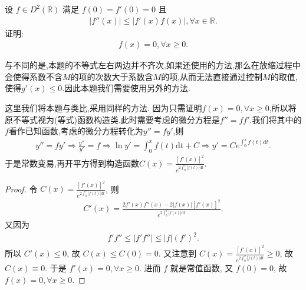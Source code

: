 \documentclass[../../main.tex]{subfiles}%
\begin{document}
\begin{example}
设 $f\in D^2(\mathbb{R})$ 满足 $f(0)=f'(0)=0$ 且
\begin{align*}
|f''(x)|\leqslant|f'(x)f(x)|,\forall x\in\mathbb{R}.
\end{align*}
证明:
\begin{align*}
f(x)=0,\forall x\geqslant 0.
\end{align*} 
\end{example}
\begin{remark}
与不同的是,本题的不等式左右两边并不齐次,如果还使用的方法,那么在放缩过程中会使得系数不含$M$的项的次数大于系数含$M$的项,从而无法直接通过控制$M$的取值,使得$g'(x)\leqslant 0$.因此本题我们需要使用另外的方法.

这里我们将本题与类比,采用同样的方法. 因为只需证明$f(x)=0,\forall x\geqslant 0$,所以将原不等式视为(等式)函数构造类.此时需要考虑的微分方程是$f''=ff'$.我们将其中的$f$看作已知函数,考虑的微分方程转化为$y''=fy'$,则
\begin{align*}
y'' =fy' \Rightarrow \frac{y''}{y'}=f\Rightarrow \ln y' =\int_0^x{f\left( t \right) \mathrm{d}t}+C\Rightarrow y' =Ce^{\int_0^x{f\left( t \right) \mathrm{d}t}}.
\end{align*}
于是常数变易,再开平方得到构造函数$C\left( x \right) =\frac{\left[ f'\left( x \right) \right] ^2}{e^{2\int_0^x{|f\left( t \right)| \mathrm{d}t}}}.$
\end{remark}
\begin{proof}
令 $C(x)=\frac{[f'(x)]^2}{e^{2\int_0^x{|f(t)|\mathrm{d}t}}}$, 则
\begin{align*}
C'(x)=\frac{2f'(x)f''(x)-2|f(x)|[f'(x)]^2}{e^{2\int_0^x{|f(t)|\mathrm{d}t}}}.
\end{align*}
又因为
\begin{align*}
f'f''\leqslant|f'f''|\leqslant|f|(f')^2.
\end{align*}
所以 $C'(x)\leqslant0$, 故 $C(x)\leqslant C(0)=0$. 又注意到 $C(x)=\frac{[f'(x)]^2}{e^{2\int_0^x{|f(t)|\mathrm{d}t}}}\geqslant0$, 故 $C(x)\equiv0$. 于是 $f'(x)=0,\forall x\geqslant0$.
进而 $f$ 就是常值函数, 又 $f(0)=0$, 故 $f(x)=0,\forall x\geqslant0$. \end{proof}
\end{document}

